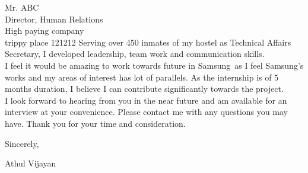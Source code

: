 \documentclass[a4paper, 11pt]{letter}
\newcommand{\pgbr}{\vspace{4pt} \\}
\newcommand{\company}{Samsung}
\begin{document}
\begin{letter}{
Mr. ABC \\
Director, Human Relations \\
High paying company\\
trippy place 121212}
Serving over 450 inmates of my hostel as Technical Affairs Secretary, I developed leadership, team work and communication skills. \pgbr
I feel it would be amazing to work towards future in \company \ as I feel \company's works and my areas of interest has lot of parallels. As the internship is of 5 months duration, I believe I can contribute significantly towards the project.\pgbr
I look forward to hearing from you in the near future and am available for an interview at your convenience. Please contact me with any questions you may have. Thank you for your time and consideration.

Sincerely,
\vspace{2\parskip} %
\newline

\noindent
Athul Vijayan
\end{letter}
\end{document}
